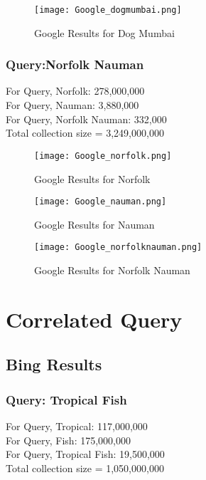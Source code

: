 \documentclass[12pt]{report}
\begin{document}
\begin{figure}[ht] 
  \centering
  \texttt{[image: Google\_dogmumbai.png]}
  \caption{Google Results for Dog Mumbai}
  \label{fig:9}
\end{figure}

\subsubsection{Query:Norfolk Nauman}
For Query, Norfolk: 278,000,000\\
For Query, Nauman: 3,880,000\\
For Query, Norfolk Nauman: 332,000\\

Total collection size = 3,249,000,000\\

\begin{figure}[ht] 
  \centering
  \texttt{[image: Google\_norfolk.png]}
  \caption{Google Results for Norfolk}
  \label{fig:10}
\end{figure}

\begin{figure}[ht] 
  \centering
  \texttt{[image: Google\_nauman.png]}
  \caption{Google Results for Nauman}
  \label{fig:11}
\end{figure}

\begin{figure}[ht] 
  \centering
  \texttt{[image: Google\_norfolknauman.png]}
  \caption{Google Results for Norfolk Nauman}
  \label{fig:12}
\end{figure}

\section{Correlated Query}
\subsection{Bing Results}
\subsubsection{Query: Tropical Fish}
For Query, Tropical: 117,000,000\\
For Query, Fish: 175,000,000\\
For Query, Tropical Fish: 19,500,000\\

Total collection size = 1,050,000,000\\
\end{document}
